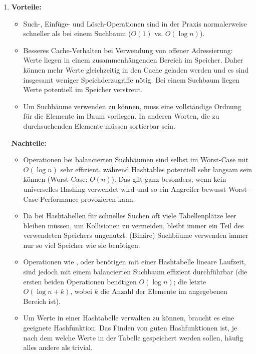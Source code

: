 \documentclass[11pt,a4paper]{article}
\begin{document}
\begin{loesung}
    \begin{enumerate}
        \item 
        \textbf{Vorteile:}
        \begin{itemize}
            \item Such-, Einfüge- und Lösch-Operationen sind in der Praxis normalerweise schneller als bei einem Suchbaum ($O(1)$ vs. $O(\log n)$).
            \item Besseres Cache-Verhalten bei Verwendung von offener Adressierung: Werte liegen in einem zusammenhängenden Bereich im Speicher.
            Daher können mehr Werte gleichzeitig in den Cache geladen werden und es sind insgesamt weniger Speichderzugriffe nötig.
            Bei einem Suchbaum liegen Werte potentiell im Speicher verstreut.
            \item Um Suchbäume verwenden zu können, muss eine vollständige Ordnung für die Elemente im Baum vorliegen.
            In anderen Worten, die zu durchsuchenden Elemente müssen sortierbar sein.
        \end{itemize}
        \textbf{Nachteile:}
        \begin{itemize}
            \item Operationen bei balancierten Suchbäumen sind selbst im Worst-Case mit $O(\log n)$ sehr effizient, während Hashtables potentiell sehr langsam sein können (Worst Case: $O(n)$).
            Das gilt ganz besonders, wenn kein universelles Hashing verwendet wird und so ein Angreifer bewusst Worst-Case-Performance provozieren kann.
            \item Da bei Hashtabellen für schnelles Suchen oft viele Tabellenplätze leer bleiben müssen, um Kollisionen zu vermeiden, bleibt immer ein Teil des verwendeten Speichers ungenutzt.
            (Binäre) Suchbäume verwenden immer nur so viel Speicher wie sie benötigen.
            \item 
            Operationen wie ,  oder  benötigen mit einer Hashtabelle lineare Laufzeit, sind jedoch mit einem balancierten Suchbaum effizient durchführbar (die ersten beiden Operationen benötigen $O(\log n)$; die letzte $O(\log n + k)$, wobei $k$ die Anzahl der Elemente im angegebenen Bereich ist).
            \item Um Werte in einer Hashtabelle verwalten zu können, braucht es eine geeignete Hashfunktion.
            Das Finden von guten Hashfunktionen ist, je nach dem welche Werte in der Tabelle gespeichert werden sollen, häufig alles andere als trivial.

\end{itemize}
\end{enumerate}
\end{loesung}
\end{document}

